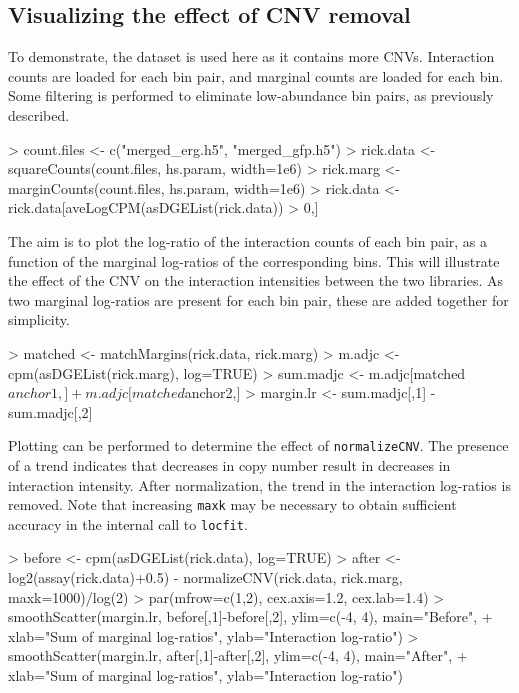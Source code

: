 \documentclass[12pt]{report}
\renewenvironment{Schunk}{\vspace{0pt}}{\vspace{0pt}}
\newcommand{\code}[1]{{\small\texttt{#1}}}
\begin{document}
\subsection{Visualizing the effect of CNV removal}
To demonstrate, the \citeauthor{rickman2012oncogene} dataset is used here as it contains more CNVs.
Interaction counts are loaded for each bin pair, and marginal counts are loaded for each bin.
Some filtering is performed to eliminate low-abundance bin pairs, as previously described.

\begin{Schunk}
\begin{Sinput}
> count.files <- c("merged_erg.h5", "merged_gfp.h5")
> rick.data <- squareCounts(count.files, hs.param, width=1e6)
> rick.marg <- marginCounts(count.files, hs.param, width=1e6)
> rick.data <- rick.data[aveLogCPM(asDGEList(rick.data)) > 0,]
\end{Sinput}
\end{Schunk}

The aim is to plot the log-ratio of the interaction counts of each bin pair, as a function of the marginal log-ratios of the corresponding bins.
This will illustrate the effect of the CNV on the interaction intensities between the two libraries.
As two marginal log-ratios are present for each bin pair, these are added together for simplicity.

\begin{Schunk}
\begin{Sinput}
> matched <- matchMargins(rick.data, rick.marg)
> m.adjc <- cpm(asDGEList(rick.marg), log=TRUE)
> sum.madjc <- m.adjc[matched$anchor1,] + m.adjc[matched$anchor2,]
> margin.lr <- sum.madjc[,1] - sum.madjc[,2]
\end{Sinput}
\end{Schunk}

Plotting can be performed to determine the effect of \code{normalizeCNV}.
The presence of a trend indicates that decreases in copy number result in decreases in interaction intensity.
After normalization, the trend in the interaction log-ratios is removed.
Note that increasing \code{maxk} may be necessary to obtain sufficient accuracy in the internal call to \code{locfit}.

\begin{Schunk}
\begin{Sinput}
> before <- cpm(asDGEList(rick.data), log=TRUE)
> after <- log2(assay(rick.data)+0.5) - normalizeCNV(rick.data, rick.marg, maxk=1000)/log(2)
> par(mfrow=c(1,2), cex.axis=1.2, cex.lab=1.4)
> smoothScatter(margin.lr, before[,1]-before[,2], ylim=c(-4, 4), main="Before",
+     xlab="Sum of marginal log-ratios", ylab="Interaction log-ratio")
> smoothScatter(margin.lr, after[,1]-after[,2], ylim=c(-4, 4), main="After",
+     xlab="Sum of marginal log-ratios", ylab="Interaction log-ratio")
\end{Sinput}
\end{Schunk}
\end{document}
